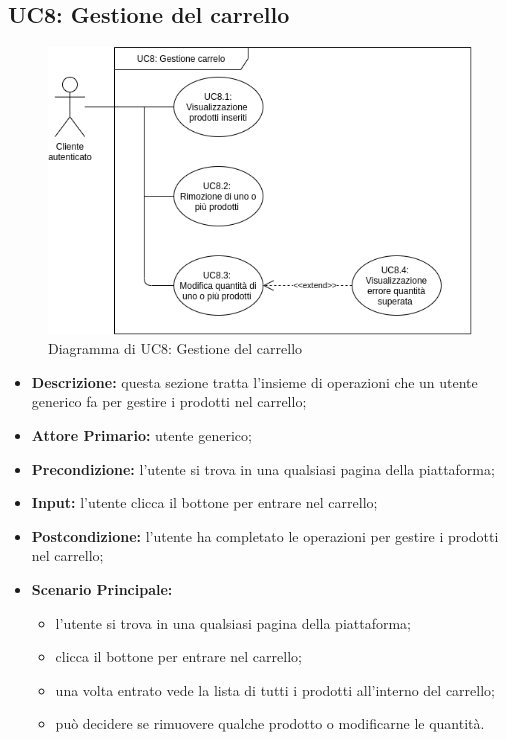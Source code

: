        \subsection{UC8: Gestione del carrello}
        \begin{figure}[!ht]
            \caption{Diagramma di UC8: Gestione del carrello}
            \vspace{10px}
            \includegraphics[scale=0.5]{../../../Images/AnalisiRequisiti/UC8}
            \centering
        \end{figure}
        \begin{itemize}
            \item \textbf{Descrizione:} questa sezione tratta l'insieme di operazioni che un utente generico fa per gestire i prodotti nel carrello;
            \item \textbf{Attore Primario:} utente generico;
            \item \textbf{Precondizione:} l'utente si trova in una qualsiasi pagina della piattaforma;
            \item \textbf{Input:} l'utente clicca il bottone per entrare nel carrello;
            \item \textbf{Postcondizione:} l'utente ha completato le operazioni per gestire i prodotti nel carrello;
            \item \textbf{Scenario Principale:}
                \begin{itemize}
                    \item l'utente si trova in una qualsiasi pagina della piattaforma;
                    \item clicca il bottone per entrare nel carrello;
                    \item una volta entrato vede la lista di tutti i prodotti all'interno del carrello;
                    \item può decidere se rimuovere qualche prodotto o modificarne le quantità.
                \end{itemize}
        \end{itemize}
